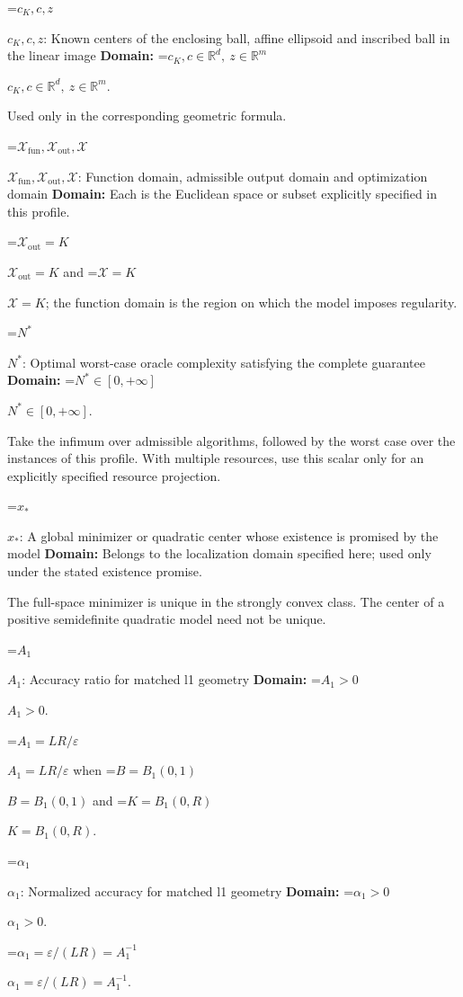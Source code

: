 \documentclass[10pt,a4paper]{article}
\newcommand{\AtlasMath}[1]{\par\begingroup\centering\setbox0=\hbox{$\displaystyle #1$}\ifdim\wd0>1.4\linewidth\typeout{ATLAS WIDE FORMULA: \the\wd0}\fi\ifdim\wd0>\linewidth\resizebox{\linewidth}{!}{\box0}\else\box0\fi\par\endgroup}
\newcommand{\AtlasInlineMath}[1]{\begingroup\setbox0=\hbox{$#1$}\ifdim\wd0>.4\linewidth\endgroup\AtlasMath{#1}\else\endgroup$#1$\fi}
\begin{document}
\AtlasInlineMath{c_K,c,z}: Known centers of the enclosing ball, affine ellipsoid and inscribed ball in the linear image \textbf{Domain:} \AtlasInlineMath{c_K,c\in\mathbb{R}^d,\ z\in\mathbb{R}^m}.



Used only in the corresponding geometric formula.



\AtlasInlineMath{\mathcal{X}_{\mathrm{fun}},\mathcal{X}_{\mathrm{out}},\mathcal{X}}: Function domain, admissible output domain and optimization domain \textbf{Domain:} Each is the Euclidean space or subset explicitly specified in this profile.



\AtlasInlineMath{\mathcal{X}_{\mathrm{out}}=K} and \AtlasInlineMath{\mathcal{X}=K}; the function domain is the region on which the model imposes regularity.



\AtlasInlineMath{N^*}: Optimal worst-case oracle complexity satisfying the complete guarantee \textbf{Domain:} \AtlasInlineMath{N^*\in[0,+\infty]}.



Take the infimum over admissible algorithms, followed by the worst case over the instances of this profile. With multiple resources, use this scalar only for an explicitly specified resource projection.



\AtlasInlineMath{x_*}: A global minimizer or quadratic center whose existence is promised by the model \textbf{Domain:} Belongs to the localization domain specified here; used only under the stated existence promise.



The full-space minimizer is unique in the strongly convex class. The center of a positive semidefinite quadratic model need not be unique.



\AtlasInlineMath{A_1}: Accuracy ratio for matched l1 geometry \textbf{Domain:} \AtlasInlineMath{A_1>0}.



\AtlasInlineMath{A_1=LR/\varepsilon} when \AtlasInlineMath{B=B_1(0,1)} and \AtlasInlineMath{K=B_1(0,R)}.



\AtlasInlineMath{\alpha_1}: Normalized accuracy for matched l1 geometry \textbf{Domain:} \AtlasInlineMath{\alpha_1>0}.



\AtlasInlineMath{\alpha_1=\varepsilon/(LR)=A_1^{-1}}.
\end{document}
